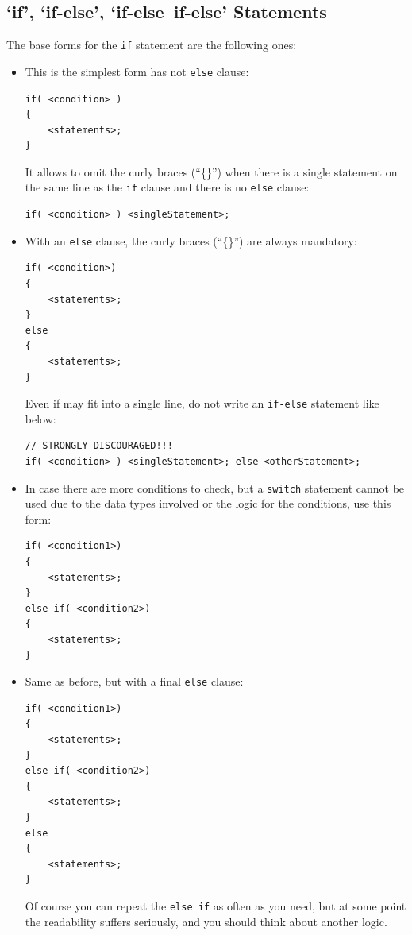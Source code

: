 \documentclass[11pt,a4paper, titlepage, parskip=half, headsepline, footsepline, cleardoublepage=current, headheight=1cm]{scrbook}
\begin{document}

\subsection{‘if’, ‘if-else’, ‘if-else~if-else’ Statements}\label{sec:IfStatements}
The base forms for the \lstinline|if| statement are the following ones:
\begin{itemize}
\item{This is the simplest form has not \lstinline|else| clause:
\begin{lstlisting}
if( <condition> )
{
    <statements>;
}
\end{lstlisting}
It allows to omit the curly braces (“\{\}”) when there is a single statement on the same line as the \lstinline|if| clause and there is no \lstinline|else| clause:
\begin{lstlisting}
if( <condition> ) <singleStatement>;
\end{lstlisting}}

\item{With an \lstinline|else| clause, the curly braces (“\{\}”) are always mandatory:
\begin{lstlisting}
if( <condition>)
{
    <statements>;
}
else
{
    <statements>;
}
\end{lstlisting}
Even if may fit into a single line, do not write an \lstinline|if-else| statement like below:
\begin{lstlisting}
// STRONGLY DISCOURAGED!!!
if( <condition> ) <singleStatement>; else <otherStatement>;
\end{lstlisting}}

\item{In case there are more conditions to check, but a \lstinline|switch| statement cannot be used due to the data types involved or the logic for the conditions, use this form:
\begin{lstlisting}
if( <condition1>)
{
    <statements>;
}
else if( <condition2>)
{
    <statements>;
}
\end{lstlisting}}

\item{Same as before, but with a final \lstinline|else| clause: 
\begin{lstlisting}
if( <condition1>)
{
    <statements>;
}
else if( <condition2>)
{
    <statements>;
}
else
{
    <statements>;
}
\end{lstlisting}
Of course you can repeat the \lstinline|else if| as often as you need, but at some point the readability suffers seriously, and you should think about another logic. }


\end{itemize}
\end{document}
